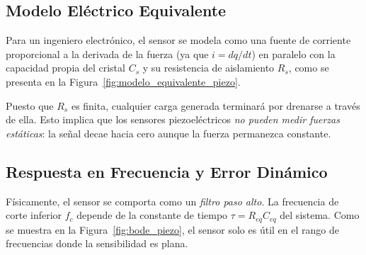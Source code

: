 \subsection{Modelo Eléctrico Equivalente}
Para un ingeniero electrónico, el sensor se modela como una fuente de corriente proporcional a la derivada de la fuerza (ya que $i = dq/dt$) en paralelo con la capacidad propia del cristal $C_s$ y su resistencia de aislamiento $R_s$, como se presenta en la Figura~\ref{fig:modelo_equivalente_piezo}.

\begin{marginfigure}
    \centering
    \shorthandoff{>}
    \caption[Circuito equivalente del sensor piezoeléctrico.]{Circuito equivalente de un sensor piezoeléctrico. $C_s$ es la capacidad interna (\qtyrange{10}{1000}{\pico F}) y $R_s$ es la resistencia de fugas, que debe ser muy elevada ($>\qty{10}{\giga\Omega}$).}\label{fig:modelo_equivalente_piezo}
\end{marginfigure}

Puesto que $R_s$ es finita, cualquier carga generada terminará por drenarse a través de ella. Esto implica que los sensores piezoeléctricos \emph{no pueden medir fuerzas estáticas}: la señal decae hacia cero aunque la fuerza permanezca constante.

\subsection{Respuesta en Frecuencia y Error Dinámico}
Físicamente, el sensor se comporta como un \emph{filtro paso alto}. La frecuencia de corte inferior $f_c$ depende de la constante de tiempo $\tau = R_{eq}C_{eq}$ del sistema. Como se muestra en la Figura~\ref{fig:bode_piezo}, el sensor solo es útil en el rango de frecuencias donde la sensibilidad es plana.


